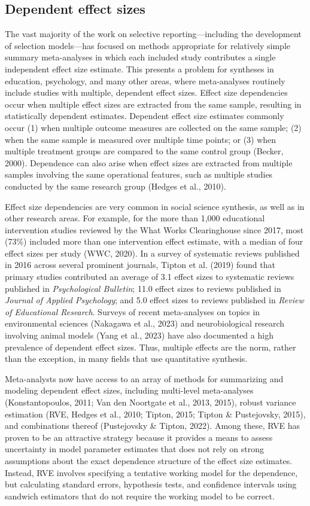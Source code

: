 \documentclass[
  american,
  man, donotrepeattitle,floatsintext]{apa7}
\begin{document}
\subsection{Dependent effect sizes}\label{dependent-effect-sizes}

The vast majority of the work on selective reporting---including the development of selection models---has focused on methods appropriate for relatively simple summary meta-analyses in which each included study contributes a single independent effect size estimate.
This presents a problem for syntheses in education, psychology, and many other areas, where meta-analyses routinely include studies with multiple, dependent effect sizes.
Effect size dependencies occur when multiple effect sizes are extracted from the same sample, resulting in statistically dependent estimates.
Dependent effect size estimates commonly occur (1) when multiple outcome measures are collected on the same sample; (2) when the same sample is measured over multiple time points; or (3) when multiple treatment groups are compared to the same control group (Becker, 2000).
Dependence can also arise when effect sizes are extracted from multiple samples involving the same operational features, such as multiple studies conducted by the same research group (Hedges et al., 2010).

Effect size dependencies are very common in social science synthesis, as well as in other research areas.
For example, for the more than 1,000 educational intervention studies reviewed by the What Works Clearinghouse since 2017, most (73\%) included more than one intervention effect estimate, with a median of four effect sizes per study (WWC, 2020).
In a survey of systematic reviews published in 2016 across several prominent journals, Tipton et al. (2019) found that primary studies contributed an average of 3.1 effect sizes to systematic reviews published in \emph{Psychological Bulletin}; 11.0 effect sizes to reviews published in \emph{Journal of Applied Psychology}; and 5.0 effect sizes to reviews published in \emph{Review of Educational Research}.
Surveys of recent meta-analyses on topics in environmental sciences (Nakagawa et al., 2023) and neurobiological research involving animal models (Yang et al., 2023) have also documented a high prevalence of dependent effect sizes.
Thus, multiple effects are the norm, rather than the exception, in many fields that use quantitative synthesis.

Meta-analysts now have access to an array of methods for summarizing and modeling dependent effect sizes, including multi-level meta-analyses (Konstantopoulos, 2011; Van den Noortgate et al., 2013, 2015), robust variance estimation (RVE, Hedges et al., 2010; Tipton, 2015; Tipton \& Pustejovsky, 2015), and combinations thereof (Pustejovsky \& Tipton, 2022).
Among these, RVE has proven to be an attractive strategy because it provides a means to assess uncertainty in model parameter estimates that does not rely on strong assumptions about the exact dependence structure of the effect size estimates.
Instead, RVE involves specifying a tentative working model for the dependence, but calculating standard errors, hypothesis tests, and confidence intervals using sandwich estimators that do not require the working model to be correct.
\end{document}
